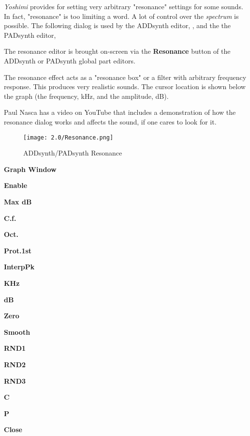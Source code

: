    \textsl{Yoshimi} provides for setting very arbitrary "resonance"
   settings for some sounds.  In fact, "resonance" is too limiting a word.
   A lot of control over the \textsl{spectrum} is possible.
   The following dialog is used by
   the ADDsynth editor,
   , and the
   the PADsynth editor,

   The resonance editor is brought on-screen via the
   \textbf{Resonance} button of the ADDsynth or PADsynth
   global part editors.

   The resonance effect acts as a "resonance box" or a filter with arbitrary
   frequency response. This produces very realistic sounds.
   The cursor location is shown below the graph (the frequency, kHz, and
   the amplitude, dB).

   Paul Nasca has a video on YouTube that includes a demonstration of how
   the resonance dialog works and affects the sound, if one cares to look for
   it.

\begin{figure}[H]
   \centering
   \texttt{[image: 2.0/Resonance.png]}
   \caption{ADDsynth/PADsynth Resonance}
   \label{fig:addsynth_resonance}
\end{figure}

   \begin{enumber}
      \item \textbf{Graph Window}
      \item \textbf{Enable}
      \item \textbf{Max dB}
      \item \textbf{C.f.}
      \item \textbf{Oct.}
      \item \textbf{Prot.1st}
      \item \textbf{InterpPk}
      \item \textbf{KHz}
      \item \textbf{dB}
      \item \textbf{Zero}
      \item \textbf{Smooth}
      \item \textbf{RND1}
      \item \textbf{RND2}
      \item \textbf{RND3}
      \item \textbf{C}
      \item \textbf{P}
      \item \textbf{Close}
   \end{enumber}

